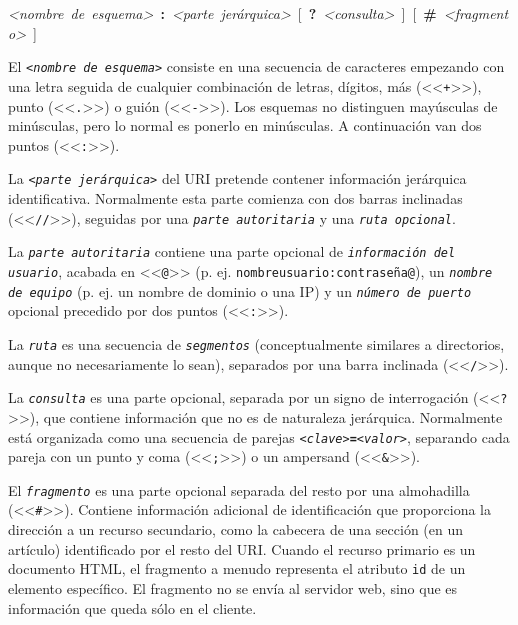 \documentclass[a4paper,11pt]{memoir}
\begin{document}
\begin{center}
\begingroup
\ttfamily\footnotesize
\emph{<nombre~de~esquema>}~\textbf{:}~\emph{<parte~jerárquica>}~{[}~\textbf{?}~\emph{<consulta>}~{]}~{[}~\textbf{\#}~\emph{<fragmento>}~{]}
\par
\endgroup
\end{center}

El \texttt{\emph{<nombre de esquema>}} consiste en una secuencia de
caracteres empezando con una letra seguida de cualquier combinación
de letras, dígitos, más (<<\texttt{+}>>), punto (<<\texttt{.}>>)
o guión (<<\texttt{-}>>). Los esquemas no distinguen mayúsculas de
minúsculas, pero lo normal es ponerlo en minúsculas. A continuación
van dos puntos (<<\texttt{:}>>).

La \texttt{\emph{<parte jerárquica>}} del URI pretende contener información
jerárquica identificativa. Normalmente esta parte comienza con dos
barras inclinadas (<<\texttt{//}>>), seguidas por una \texttt{\emph{parte autoritaria}}
y una \emph{\texttt{ruta opcional}}.

La \emph{\texttt{parte autoritaria}} contiene una parte opcional de
\emph{\texttt{información del usuario}}, acabada en <<\texttt{@}>>
(p. ej. \texttt{nombreusuario:contraseña@}), un \emph{\texttt{nombre de equipo}}
(p. ej. un nombre de dominio o una IP) y un \emph{\texttt{número de puerto}}
opcional precedido por dos puntos (<<\texttt{:}>>).

La \texttt{\emph{ruta}} es una secuencia de \texttt{\emph{segmentos}}
(conceptualmente similares a directorios, aunque no necesariamente
lo sean), separados por una barra inclinada (<<\texttt{/}>>).

La \texttt{\emph{consulta}} es una parte opcional, separada por un
signo de interrogación (<<\texttt{?}>>), que contiene información
que no es de naturaleza jerárquica. Normalmente está organizada como
una secuencia de parejas \texttt{\emph{<clave>}\textbf{=}\emph{<valor>}},
separando cada pareja con un punto y coma (<<\texttt{;}>>) o un ampersand
(<<\texttt{\&}>>).

El \texttt{\emph{fragmento}} es una parte opcional separada del resto
por una almohadilla (<<\texttt{\#}>>). Contiene información adicional
de identificación que proporciona la dirección a un recurso secundario,
como la cabecera de una sección (en un artículo) identificado por
el resto del URI. Cuando el recurso primario es un documento HTML,
el fragmento a menudo representa el atributo \texttt{id} de un elemento
específico. El fragmento no se envía al servidor web, sino que es
información que queda sólo en el cliente.
\end{document}
